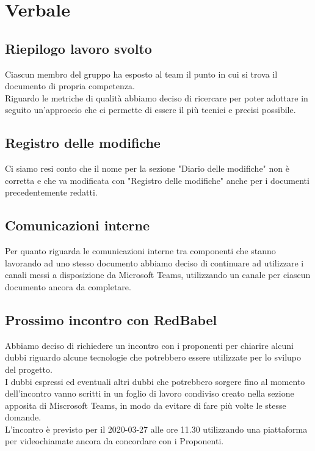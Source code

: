 \section{Verbale}
	
	\subsection{Riepilogo lavoro svolto}
		Ciascun membro del gruppo ha esposto al team il punto in cui si trova il documento di propria competenza. \\
		Riguardo le metriche di qualità abbiamo deciso di ricercare per poter adottare in seguito un'approccio che ci permette di essere il più tecnici e precisi possibile.
		
		
	\subsection{Registro delle modifiche}
		Ci siamo resi conto che il nome per la sezione "Diario delle modifiche" non è corretta e che va modificata con "Registro delle modifiche" anche per i documenti precedentemente redatti.

	\subsection{Comunicazioni interne}
		Per quanto riguarda le comunicazioni interne tra componenti che stanno lavorando ad uno stesso documento abbiamo deciso di continuare ad utilizzare i canali messi a disposizione da Microsoft Teams, utilizzando un canale per ciascun documento ancora da completare.
		
	\subsection{Prossimo incontro con RedBabel}
		Abbiamo deciso di richiedere un incontro con i proponenti per chiarire alcuni dubbi riguardo alcune tecnologie che potrebbero essere utilizzate per lo svilupo del progetto. \\
		I dubbi espressi ed eventuali altri dubbi che potrebbero sorgere fino al momento dell'incontro vanno scritti in un foglio di lavoro condiviso creato nella sezione apposita di Miscrosoft Teams, in modo da evitare di fare più volte le stesse domande. \\
		L'incontro è previsto per il 2020-03-27 alle ore 11.30 utilizzando una piattaforma per videochiamate ancora da concordare con i Proponenti.

